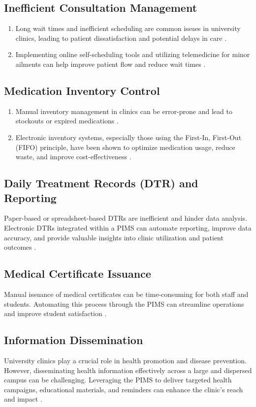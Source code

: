 \subsection{Inefficient Consultation Management}
\begin{enumerate}
    \item Long wait times and inefficient scheduling are common issues in university clinics, leading to patient dissatisfaction and potential delays in care \cite{biya2022}.
    \item Implementing online self-scheduling tools and utilizing telemedicine for minor ailments can help improve patient flow and reduce wait times \cite{byun2022}.
\end{enumerate}

\subsection{Medication Inventory Control}
\begin{enumerate}
    \item Manual inventory management in clinics can be error-prone and lead to stockouts or expired medications \cite{deressa2022}.
    \item Electronic inventory systems, especially those using the First-In, First-Out (FIFO) principle, have been shown to optimize medication usage, reduce waste, and improve cost-effectiveness \cite{sohrabi2021}.
\end{enumerate}

\subsection{Daily Treatment Records (DTR) and Reporting}
Paper-based or spreadsheet-based DTRs are inefficient and hinder data analysis. Electronic DTRs integrated within a PIMS can automate reporting, improve data accuracy, and provide valuable insights into clinic utilization and patient outcomes \cite{baumann2018}.

\subsection{Medical Certificate Issuance}
Manual issuance of medical certificates can be time-consuming for both staff and students. Automating this process through the PIMS can streamline operations and improve student satisfaction \cite{hu2023}.

\subsection{Information Dissemination}
University clinics play a crucial role in health promotion and disease prevention. However, disseminating health information effectively across a large and dispersed campus can be challenging. Leveraging the PIMS to deliver targeted health campaigns, educational materials, and reminders can enhance the clinic’s reach and impact \cite{iribarren2021}.

